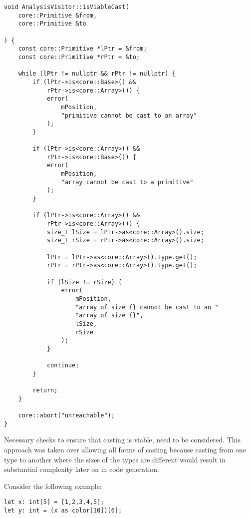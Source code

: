 \begin{lstlisting}[caption={The \texttt{isViableCast()} method
in the \texttt{AnalysisVisitor} class
(analysis/AnalysisVisitor.cpp)}]
void AnalysisVisitor::isViableCast(
    core::Primitive &from,
    core::Primitive &to

) {
    const core::Primitive *lPtr = &from;
    const core::Primitive *rPtr = &to;

    while (lPtr != nullptr && rPtr != nullptr) {
        if (lPtr->is<core::Base>() &&
            rPtr->is<core::Array>()) {
            error(
                mPosition,
                "primitive cannot be cast to an array"
            );
        }

        if (lPtr->is<core::Array>() &&
            rPtr->is<core::Base>()) {
            error(
                mPosition,
                "array cannot be cast to a primitive"
            );
        }

        if (lPtr->is<core::Array>() &&
            rPtr->is<core::Array>()) {
            size_t lSize = lPtr->as<core::Array>().size;
            size_t rSize = rPtr->as<core::Array>().size;

            lPtr = lPtr->as<core::Array>().type.get();
            rPtr = rPtr->as<core::Array>().type.get();

            if (lSize != rSize) {
                error(
                    mPosition,
                    "array of size {} cannot be cast to an "
                    "array of size {}",
                    lSize,
                    rSize
                );
            }

            continue;
        }

        return;
    }

    core::abort("unreachable");
}
\end{lstlisting}

Necessary checks to ensure that casting is viable, need to be
considered. This approach was taken over allowing all forms of
casting because casting from one type to another where the sizes
of the types are different would result in substantial
complexity later on in code generation.

Consider the following example:

\begin{center}
\begin{minipage}[l]{0.54\linewidth}
\begin{lstlisting}[morekeywords={color}]
let x: int[5] = [1,2,3,4,5];
let y: int = (x as color[10])[6];
\end{lstlisting}
\end{minipage}
\end{center}

